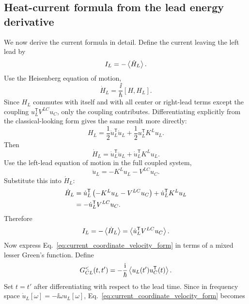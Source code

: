 \subsection{Heat-current formula from the lead energy derivative}
We now derive the current formula in detail. Define the current leaving the left lead by
\begin{equation}
    I_L = -\left\langle \dot H_L \right\rangle.
    \label{eq:current_def_start}
\end{equation}
Use the Heisenberg equation of motion,
\begin{equation}
    \dot H_L = \frac{\ii}{\hbar}[H,H_L].
\end{equation}
Since $H_L$ commutes with itself and with all center or right-lead terms except the coupling $u_L^{\mathsf T}V^{LC}u_C$, only the coupling contributes. Differentiating explicitly from the classical-looking form gives the same result more directly:
\begin{equation}
    H_L = \frac{1}{2}\dot u_L^{\mathsf T}\dot u_L + \frac{1}{2}u_L^{\mathsf T}K^L u_L.
\end{equation}
Then
\begin{equation}
    \dot H_L = \dot u_L^{\mathsf T}\ddot u_L + \dot u_L^{\mathsf T}K^L u_L.
\end{equation}
Use the left-lead equation of motion in the full coupled system,
\begin{equation}
    \ddot u_L = -K^L u_L - V^{LC}u_C.
\end{equation}
Substitute this into $\dot H_L$:
\begin{align}
    \dot H_L
    &= \dot u_L^{\mathsf T}\left( -K^L u_L - V^{LC}u_C \right) + \dot u_L^{\mathsf T}K^L u_L \\
    &= -\dot u_L^{\mathsf T}V^{LC}u_C.
\end{align}
Therefore
\begin{equation}
    I_L = -\left\langle \dot H_L \right\rangle = \left\langle \dot u_L^{\mathsf T}V^{LC}u_C \right\rangle.
    \label{eq:current_coordinate_velocity_form}
\end{equation}
Now express Eq.~\eqref{eq:current_coordinate_velocity_form} in terms of a mixed lesser Green's function. Define
\begin{equation}
    G_{CL}^<(t,t') = -\frac{\mathrm{i}}{\hbar}\left\langle u_L(t')u_C^{\mathsf T}(t) \right\rangle.
    \label{eq:mixed_lesser_definition}
\end{equation}
Set $t=t'$ after differentiating with respect to the lead time. Since in frequency space $\dot u_L[\omega] = -\ii\omega u_L[\omega]$, Eq.~\eqref{eq:current_coordinate_velocity_form} becomes
